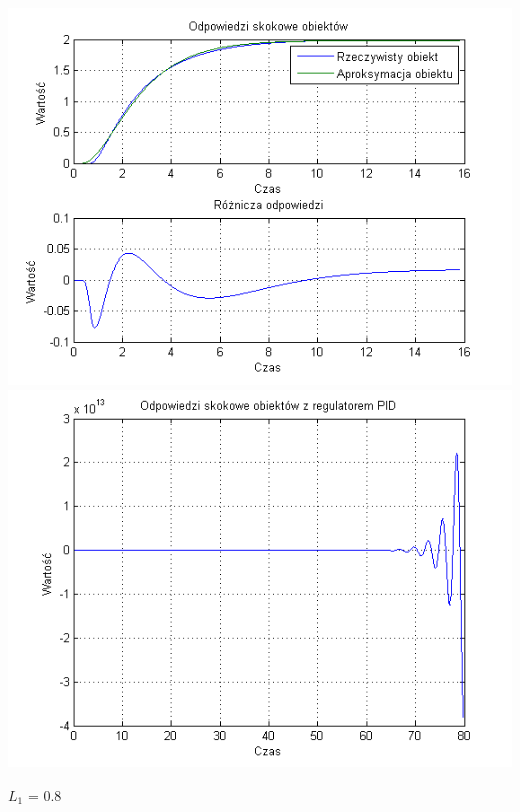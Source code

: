 \documentclass[10pt,a4paper]{article}
\begin{document}
\begin{center}
\includegraphics[scale=1]{images/dwa/skrypt_183.png}\\
\includegraphics[scale=1]{images/dwa/skrypt_184.png}\\
\end{center}
\newpage
$L_1$ = 0.8
\end{document}
